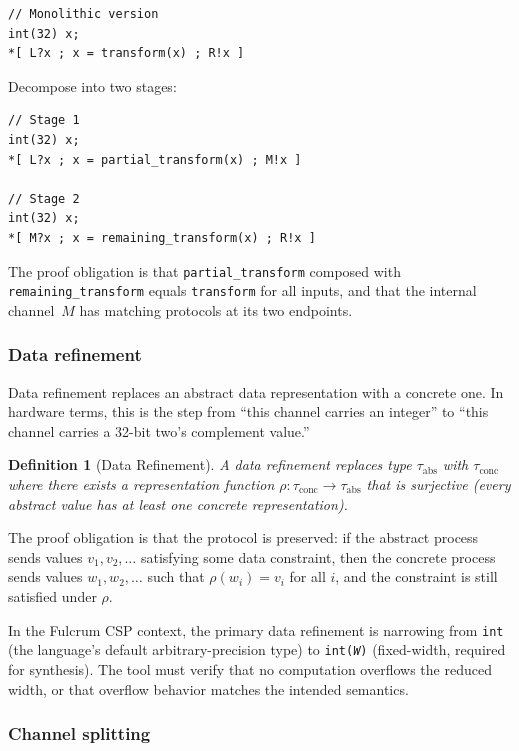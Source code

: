 \documentclass[11pt]{article}
\newcommand{\nonterminal}[1]{\textit{#1}}
\newtheorem{definition}[theorem]{Definition}
\begin{document}
\begin{Verbatim}[samepage=true]
// Monolithic version
int(32) x;
*[ L?x ; x = transform(x) ; R!x ]
\end{Verbatim}

Decompose into two stages:

\begin{Verbatim}[samepage=true]
// Stage 1
int(32) x;
*[ L?x ; x = partial_transform(x) ; M!x ]

// Stage 2
int(32) x;
*[ M?x ; x = remaining_transform(x) ; R!x ]
\end{Verbatim}

The proof obligation is that \texttt{partial\_transform} composed with
\texttt{remaining\_transform} equals \texttt{transform} for all
inputs, and that the internal channel~$M$ has matching protocols
at its two endpoints.

\subsubsection{Data refinement}

Data refinement replaces an abstract data representation with a
concrete one.  In hardware terms, this is the step from ``this channel
carries an integer'' to ``this channel carries a 32-bit two's
complement value.''

\begin{definition}[Data Refinement]
A data refinement replaces type $\tau_{\text{abs}}$ with
$\tau_{\text{conc}}$ where there exists a representation function
$\rho : \tau_{\text{conc}} \to \tau_{\text{abs}}$ that is surjective
(every abstract value has at least one concrete representation).
\end{definition}

The proof obligation is that the protocol is preserved: if the
abstract process sends values $v_1, v_2, \ldots$ satisfying some
data constraint, then the concrete process sends values $w_1, w_2,
\ldots$ such that $\rho(w_i) = v_i$ for all $i$, and the constraint
is still satisfied under $\rho$.

In the Fulcrum CSP context, the primary data refinement is narrowing
from \texttt{int} (the language's default arbitrary-precision type) to
\texttt{int(\nonterminal{W})} (fixed-width, required for synthesis).  The tool
must verify that no computation overflows the reduced width, or that
overflow behavior matches the intended semantics.

\subsubsection{Channel splitting}
\end{document}
